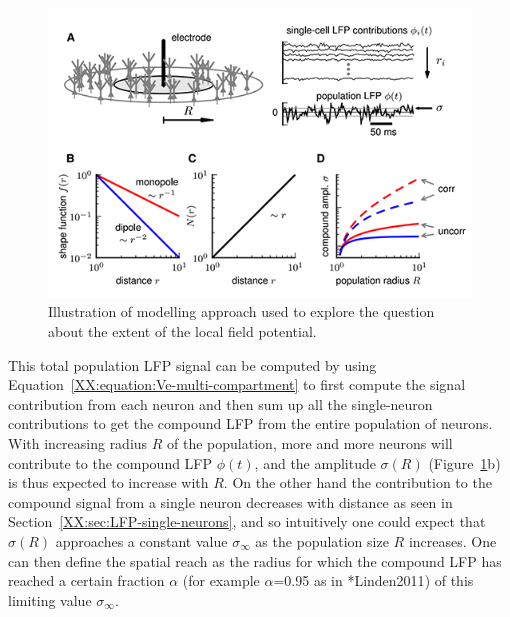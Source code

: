 \begin{figure}
\begin{center}
\includegraphics{Figures/LFP/LFP-how-local-is-the-LFP-w90-r150}
\end{center}
\caption[]{Illustration of modelling approach used to explore the question
about the extent of the local field potential.
}
\label{LFP:fig:how-local}
\end{figure}
  
This total population LFP signal can be computed by using 
Equation~\ref{XX:equation:Ve-multi-compartment} to first compute the signal contribution from each neuron and 
then sum up all the single-neuron contributions to get the compound LFP from the entire population of neurons.
With increasing radius $R$ of the population, more and more neurons will contribute to the compound LFP $\phi(t)$,
and the amplitude $\sigma(R)$ (Figure~\ref{LFP:fig:how-local}b) is thus expected to increase with
$R$. On the other hand the contribution to the compound signal from a single neuron decreases with distance 
as seen in Section~\ref{XX:sec:LFP-single-neurons}, and so intuitively one could expect that $\sigma(R)$ approaches
a constant value $\sigma_\infty$ as the population size $R$ increases. One can then define the spatial reach as the radius for which
the compound LFP has reached a certain fraction $\alpha$ (for example $\alpha$=0.95 as in \citeasnoun**{Linden2011}) of this limiting value $\sigma_\infty$. 

